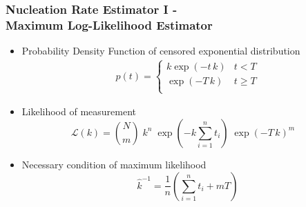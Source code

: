 \documentclass[smaller,notes=hide]{beamer}
\newlength{\wideitemsep}
\let\olditem\item
\renewcommand{\item}{\setlength{\itemsep}{\wideitemsep}\olditem}
\begin{document}
\fi







\begin{frame}
\frametitle{Nucleation Rate Estimator I -\\ \hfill Maximum Log-Likelihood Estimator}
\begin{itemize}
\item Probability Density Function of censored exponential distribution
\begin{align*}
p(t) = 
\begin{cases}
k \exp(-t \, k) & t < T\\
\exp(- T \, k) & t \geq T\\ 
\end{cases}
\end{align*}

\item Likelihood of measurement
\begin{equation*}
\mathcal{L}(k)  =  \binom{N}{m} \;  k^{n} \; \exp\left(- k \sum_{i=1}^n t_i \right) \;  \exp\left(-T \, k \right)^{m} \quad %
\end{equation*}

\item Necessary condition of maximum likelihood
\begin{equation*}
\hat{k}^{-1} = \frac{1}{n} \left(  \sum_{i=1}^n t_i + m T \right)
\end{equation*}
\end{itemize}
\end{frame}
\end{document}
